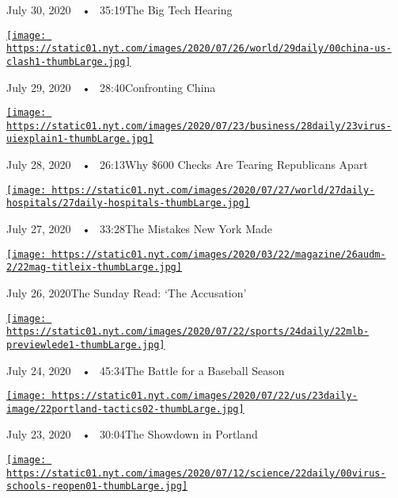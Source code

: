 July 30, 2020~~•~ 35:19The Big Tech Hearing

\href{https://www.nytimes.com/2020/07/29/podcasts/the-daily/china-trump-foreign-policy.html?action=click\&module=audio-series-bar\&region=header\&pgtype=Article}{\texttt{[image: https://static01.nyt.com/images/2020/07/26/world/29daily/00china-us-clash1-thumbLarge.jpg]}}

July 29, 2020~~•~ 28:40Confronting China

\href{https://www.nytimes.com/2020/07/28/podcasts/the-daily/unemployment-benefits-coronavirus.html?action=click\&module=audio-series-bar\&region=header\&pgtype=Article}{\texttt{[image: https://static01.nyt.com/images/2020/07/23/business/28daily/23virus-uiexplain1-thumbLarge.jpg]}}

July 28, 2020~~•~ 26:13Why \$600 Checks Are Tearing Republicans Apart

\href{https://www.nytimes.com/2020/07/27/podcasts/the-daily/new-york-hospitals-covid.html?action=click\&module=audio-series-bar\&region=header\&pgtype=Article}{\texttt{[image: https://static01.nyt.com/images/2020/07/27/world/27daily-hospitals/27daily-hospitals-thumbLarge.jpg]}}

July 27, 2020~~•~ 33:28The Mistakes New York Made

\href{https://www.nytimes.com/2020/07/26/podcasts/the-daily/the-accusation-the-sunday-read.html?action=click\&module=audio-series-bar\&region=header\&pgtype=Article}{\texttt{[image: https://static01.nyt.com/images/2020/03/22/magazine/26audm-2/22mag-titleix-thumbLarge.jpg]}}

July 26, 2020The Sunday Read: `The Accusation'

\href{https://www.nytimes.com/2020/07/24/podcasts/the-daily/mlb-baseball-season-coronavirus.html?action=click\&module=audio-series-bar\&region=header\&pgtype=Article}{\texttt{[image: https://static01.nyt.com/images/2020/07/22/sports/24daily/22mlb-previewlede1-thumbLarge.jpg]}}

July 24, 2020~~•~ 45:34The Battle for a Baseball Season

\href{https://www.nytimes.com/2020/07/23/podcasts/the-daily/portland-protests.html?action=click\&module=audio-series-bar\&region=header\&pgtype=Article}{\texttt{[image: https://static01.nyt.com/images/2020/07/22/us/23daily-image/22portland-tactics02-thumbLarge.jpg]}}

July 23, 2020~~•~ 30:04The Showdown in Portland

\href{https://www.nytimes.com/2020/07/22/podcasts/the-daily/school-reopenings-coronavirus.html?action=click\&module=audio-series-bar\&region=header\&pgtype=Article}{\texttt{[image: https://static01.nyt.com/images/2020/07/12/science/22daily/00virus-schools-reopen01-thumbLarge.jpg]}}

